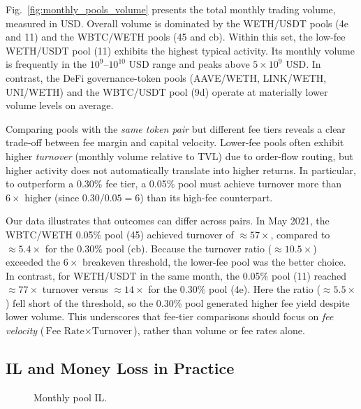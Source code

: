 \documentclass[journal]{IEEEtran}
\begin{document}
Fig.~\ref{fig:monthly_pools_volume} presents the total monthly trading volume, measured in USD. 
Overall volume is dominated by the WETH/USDT pools (4e and 11) and the WBTC/WETH pools (45 and cb). 
Within this set, the low-fee WETH/USDT pool (11) exhibits the highest typical activity. 
Its monthly volume is frequently in the $10^{9}$--$10^{10}$ USD range and peaks above $5\times10^{9}$ USD. 
In contrast, the DeFi governance-token pools (AAVE/WETH, LINK/WETH, UNI/WETH) and the WBTC/USDT pool (9d) operate at materially lower volume levels on average.

Comparing pools with the \emph{same token pair} but different fee tiers reveals a clear trade-off between fee margin and capital velocity. 
Lower-fee pools often exhibit higher \emph{turnover} (monthly volume relative to TVL) due to order-flow routing, but higher activity does not automatically translate into higher returns. 
In particular, to outperform a 0.30\% fee tier, a 0.05\% pool must achieve turnover more than $6\times$ higher (since $0.30/0.05=6$) than its high-fee counterpart.

Our data illustrates that outcomes can differ across pairs. 
In May 2021, the WBTC/WETH 0.05\% pool (45) achieved turnover of $\approx57\times$, compared to $\approx5.4\times$ for the 0.30\% pool (cb). 
Because the turnover ratio ($\approx10.5\times$) exceeded the $6\times$ breakeven threshold, the lower-fee pool was the better choice. 
In contrast, for WETH/USDT in the same month, the 0.05\% pool (11) reached $\approx77\times$ turnover versus $\approx14\times$ for the 0.30\% pool (4e). 
Here the ratio ($\approx5.5\times$) fell short of the threshold, so the 0.30\% pool generated higher fee yield despite lower volume. 
This underscores that fee-tier comparisons should focus on \emph{fee velocity} ($\text{Fee Rate}\times\text{Turnover}$), rather than volume or fee rates alone.




\subsection{IL and Money Loss in Practice}

\begin{figure}[b]
  \centering
    \resizebox{0.5\textwidth}{!}{%
        
    }
  \caption{Monthly pool IL.}
  \label{fig:monthly_il}
\end{figure}
\end{document}

